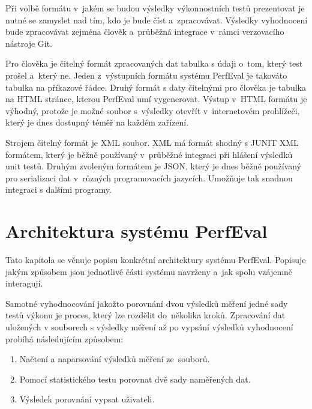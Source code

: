 Při volbě formátu v~jakém se budou výsledky výkonnostních testů prezentovat je nutné se zamyslet nad tím, kdo je bude číst a~zpracovávat.
Výsledky vyhodnocení bude zpracovávat zejména člověk a~průběžná integrace v~rámci verzovacího nástroje Git.

Pro člověka je čitelný formát zpracovaných dat tabulka s údaji o~tom, který test prošel a~který ne.
Jeden z~výstupních formátu systému PerfEval je takováto tabulka na příkazové řádce. Druhý formát s daty čitelnými pro člověka je
tabulka na HTML stránce, kterou PerfEval umí vygenerovat. Výstup v~HTML formátu je výhodný, protože je možné
soubor s~výsledky otevřít v~internetovém prohlížeči, který je dnes dostupný téměř na každém zařízení.

Strojem čitelný formát je XML soubor. XML má formát shodný s JUNIT XML formátem, který je běžně používaný v~průběžné integraci
při hlášení výsledků unit testů. Druhým zvoleným formátem je JSON, který je dnes běžně používaný pro serializaci dat v~různých
programovacích jazycích. Umožňuje tak snadnou integraci s dalšími programy.

\section{Architektura systému PerfEval}

Tato kapitola se věnuje popisu konkrétní architektury systému PerfEval.
Popisuje jakým způsobem jsou jednotlivé části systému navrženy a~jak spolu vzájemně interagují.

Samotné vyhodnocování jakožto porovnání dvou výsledků měření jedné sady testů výkonu je proces, který lze rozdělit do~několika kroků.
Zpracování dat uložených v souborech s výsledky měření až po vypsání výsledků vyhodnocení probíhá následujícím způsobem:

\begin{enumerate}
    \item Načtení a naparsování výsledků měření ze~souborů.
    \item Pomocí statistického testu porovnat dvě sady naměřených dat.
    \item Výsledek porovnání vypsat uživateli.
\end{enumerate}

